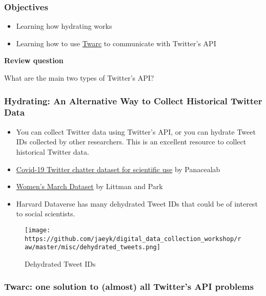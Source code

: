 \documentclass[
]{book}
\providecommand{\tightlist}{%
  \setlength{\itemsep}{0pt}\setlength{\parskip}{0pt}}
\begin{document}
\hypertarget{objectives-5}{%
\subsubsection{Objectives}\label{objectives-5}}

\begin{itemize}
\tightlist
\item
  Learning how hydrating works
\item
  Learning how to use \href{https://github.com/DocNow/twarc}{Twarc} to communicate with Twitter's API
\end{itemize}

\textbf{Review question}

What are the main two types of Twitter's API?

\hypertarget{hydrating-an-alternative-way-to-collect-historical-twitter-data}{%
\subsubsection{Hydrating: An Alternative Way to Collect Historical Twitter Data}\label{hydrating-an-alternative-way-to-collect-historical-twitter-data}}

\begin{itemize}
\item
  You can collect Twitter data using Twitter's API, or you can hydrate Tweet IDs collected by other researchers. This is an excellent resource to collect historical Twitter data.
\item
  \href{http://www.panacealab.org/covid19/}{Covid-19 Twitter chatter dataset for scientific use} by Panacealab
\item
  \href{https://dataverse.harvard.edu/dataset.xhtml?persistentId=doi:10.7910/DVN/5ZVMOR}{Women's March Dataset} by Littman and Park
\item
  Harvard Dataverse has many dehydrated Tweet IDs that could be of interest to social scientists.
\end{itemize}

\begin{figure}
\centering
\texttt{[image: https://github.com/jaeyk/digital\_data\_collection\_workshop/raw/master/misc/dehydrated\_tweets.png]}
\caption{Dehydrated Tweet IDs}
\end{figure}

\hypertarget{twarc-one-solution-to-almost-all-twitters-api-problems}{%
\subsubsection{Twarc: one solution to (almost) all Twitter's API problems}\label{twarc-one-solution-to-almost-all-twitters-api-problems}}
\end{document}
